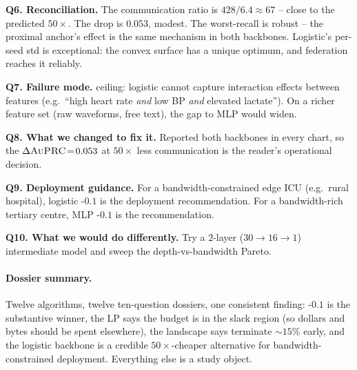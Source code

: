 \textbf{Q6. Reconciliation.}
The communication ratio is $428/6.4 \!\approx\! 67$ -- close to the
predicted $50\!\times$. The \auprc{} drop is $0.053$, modest. The
worst-recall is robust -- the proximal anchor's effect is the same
mechanism in both backbones. Logistic's per-seed std is exceptional:
the convex surface has a unique optimum, and federation reaches it
reliably.

\textbf{Q7. Failure mode.}
\auprc{} ceiling: logistic cannot capture interaction effects between
features (e.g.\ ``high heart rate \emph{and} low BP \emph{and} elevated
lactate''). On a richer feature set (raw waveforms, free text), the
gap to MLP would widen.

\textbf{Q8. What we changed to fix it.}
Reported both backbones in every chart, so the $\Delta\textsc{AuPRC}{}\!=\!
0.053$ at $50\!\times$ less communication is the reader's
operational decision.

\textbf{Q9. Deployment guidance.}
For a bandwidth-constrained edge ICU (e.g.\ rural hospital), logistic
\fedprox{}-$0.1$ is the deployment recommendation. For a
bandwidth-rich tertiary centre, MLP \fedprox{}-$0.1$ is the
recommendation.

\textbf{Q10. What we would do differently.}
Try a $2$-layer ($30 \!\to\! 16 \!\to\! 1$) intermediate model and
sweep the depth-vs-bandwidth Pareto.

\paragraph{Dossier summary.}
Twelve algorithms, twelve ten-question dossiers, one consistent
finding: \fedprox{}-$0.1$ is the substantive winner, the LP says the
budget is in the slack region (so dollars and bytes should be spent
elsewhere), the landscape says terminate $\sim$$15\%$ early, and the
logistic backbone is a credible $50\!\times$-cheaper alternative for
bandwidth-constrained deployment. Everything else is a study object.
